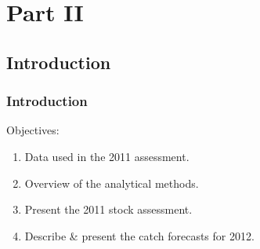 
\section{Part II} %
\label{sec:part_ii}

\subsection{Introduction} %
\label{sub:introduction}
%
\begin{frame}[t]\frametitle{Introduction}
	Objectives:
	\begin{enumerate}
		\item Data used in the 2011 assessment.
		\item Overview of the analytical methods.
		\item Present the 2011 stock assessment.
		\item Describe \& present the catch forecasts for 2012.
	\end{enumerate}
\end{frame}


